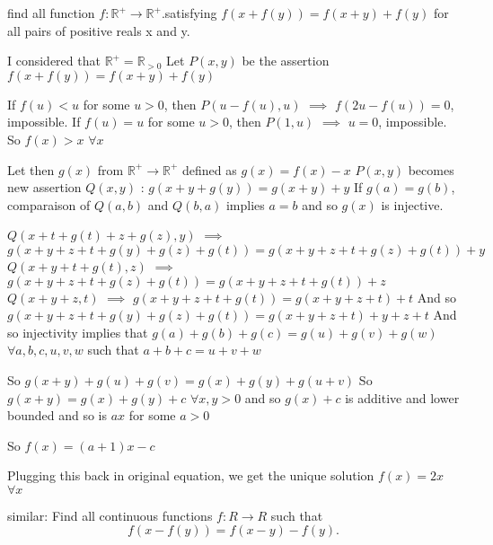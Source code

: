 \begin{solution}
	\begin{tcolorbox}find all function $ f:\mathbb{R}^{+}\to\mathbb{R}^{+} $.satisfying $ f\left(x+f\left(y\right)\right) = f\left(x+y\right)+f\left(y\right) $  for all pairs of positive reals x and y.\end{tcolorbox}
I considered that $\mathbb R^+=\mathbb R_{>0}$
Let $P(x,y)$ be the assertion $f(x+f(y))=f(x+y)+f(y)$

If $f(u)<u$ for some $u>0$, then $P(u-f(u),u)$ $\implies$ $f(2u-f(u))=0$, impossible.
If $f(u)=u$ for some $u>0$, then $P(1,u)$ $\implies$ $u=0$, impossible.
So $f(x)>x$ $\forall x$

Let then $g(x)$ from $\mathbb R^+\to\mathbb R^+$ defined as $g(x)=f(x)-x$
$P(x,y)$ becomes new assertion $Q(x,y)$ : $g(x+y+g(y))=g(x+y)+y$
If $g(a)=g(b)$, comparaison of $Q(a,b)$ and $Q(b,a)$ implies $a=b$ and so $g(x)$ is injective.

$Q(x+t+g(t)+z+g(z),y)$ $\implies$ $g(x+y+z+t+g(y)+g(z)+g(t))=g(x+y+z+t+g(z)+g(t))+y$
$Q(x+y+t+g(t),z)$ $\implies$ $g(x+y+z+t+g(z)+g(t))=g(x+y+z+t+g(t))+z$
$Q(x+y+z,t)$ $\implies$ $g(x+y+z+t+g(t))=g(x+y+z+t)+t$
And so $g(x+y+z+t+g(y)+g(z)+g(t))=g(x+y+z+t)+y+z+t$
And so injectivity implies that $g(a)+g(b)+g(c)=g(u)+g(v)+g(w)$ $\forall a,b,c,u,v,w$ such that $a+b+c=u+v+w$

So $g(x+y)+g(u)+g(v)=g(x)+g(y)+g(u+v)$
So $g(x+y)=g(x)+g(y)+c$ $\forall x,y>0$ and so $g(x)+c$ is additive and lower bounded and so is $ax$ for some $a>0$

So $f(x)=(a+1)x-c$

Plugging this back in original equation, we get the unique solution $\boxed{f(x)=2x}$ $\forall x$
\end{solution}



\begin{solution}
	similar:
Find all continuous functions $f:R \rightarrow R$ such that \[ f(x-f(y))=f(x-y)-f(y). \]
\end{solution}



